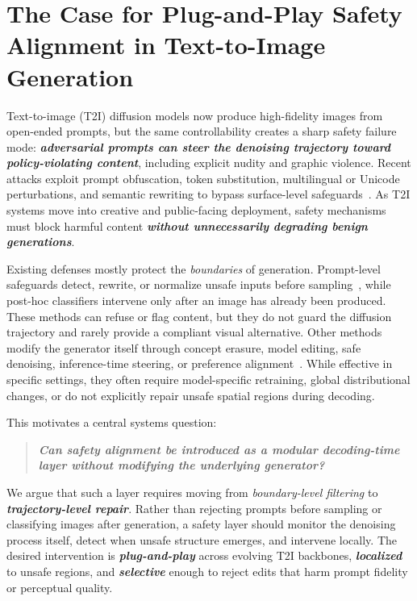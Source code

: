 \documentclass[11pt]{article}
\begin{document}
\section{The Case for Plug-and-Play Safety Alignment in Text-to-Image Generation}
\label{sec:motivation_positioning}

Text-to-image (T2I) diffusion models now produce high-fidelity images from open-ended prompts, but the same controllability creates a sharp safety failure mode: \textbf{\emph{adversarial prompts can steer the denoising trajectory toward policy-violating content}}, including explicit nudity and graphic violence. Recent attacks exploit prompt obfuscation, token substitution, multilingual or Unicode perturbations, and semantic rewriting to bypass surface-level safeguards~\cite{yang2023sneakprompt,mma2024,rabell2024,daca2024,pgj2024,struppek2023homoglyphs,ba2023surrogateprompt}. As T2I systems move into creative and public-facing deployment, safety mechanisms must block harmful content \textbf{\emph{without unnecessarily degrading benign generations}}.

Existing defenses mostly protect the \emph{boundaries} of generation. Prompt-level safeguards detect, rewrite, or normalize unsafe inputs before sampling~\cite{posi2024,lyu2024latentguard}, while post-hoc classifiers intervene only after an image has already been produced. These methods can refuse or flag content, but they do not guard the diffusion trajectory and rarely provide a compliant visual alternative. Other methods modify the generator itself through concept erasure, model editing, safe denoising, inference-time steering, or preference alignment~\cite{schramowski2023safe,gandikota2023erasing,meng2026safetytaxmitigatingunsafe,kim2025safedenoiser,wallace2023diffusion_dpo,li2024diffusion_kto,borso2025d3po,hong2025marginawarepreferenceoptimizationaligning,duo2024,li2024safegen,zhang2025shielddiff,liu2024prefpaint}. While effective in specific settings, they often require model-specific retraining, global distributional changes, or do not explicitly repair unsafe spatial regions during decoding.

This motivates a central systems question:
\begin{quote}
\centering
\emph{\textbf{Can safety alignment be introduced as a modular decoding-time layer without modifying the underlying generator?}}
\end{quote}

We argue that such a layer requires moving from \emph{boundary-level filtering} to \textbf{\emph{trajectory-level repair}}. Rather than rejecting prompts before sampling or classifying images after generation, a safety layer should monitor the denoising process itself, detect when unsafe structure emerges, and intervene locally. The desired intervention is \textbf{\emph{plug-and-play}} across evolving T2I backbones, \textbf{\emph{localized}} to unsafe regions, and \textbf{\emph{selective}} enough to reject edits that harm prompt fidelity or perceptual quality.
\end{document}
